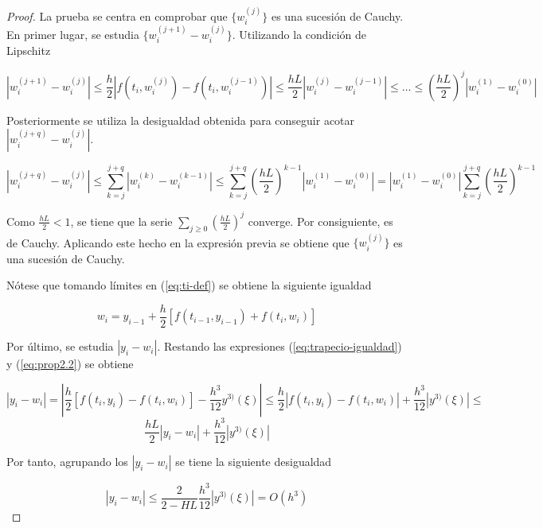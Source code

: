 \documentclass{article}
\theoremstyle{theorem-style}  %
\theoremstyle{definition}
\theoremstyle{example-style}
\begin{document}
		\begin{proof}
			La prueba se centra en comprobar que $\{w_i^{(j)}\}$ es una sucesión de Cauchy. En primer lugar, se estudia $\{w_{i}^{(j+1)} - w_{i}^{(j)}\}$. Utilizando la condición de Lipschitz
			
			\begin{equation*}
			\left|w_{i}^{(j+1)} - w_{i}^{(j)}\right| \le \frac{h}{2} \left| f(t_i, w_i^{(j)}) - f(t_i, w_i^{(j-1)}) \right| \le \frac{hL}{2} \left| w_i^{(j)} - w_i^{(j-1)} \right| \le \ldots \le \left(\frac{hL}{2}\right)^j \left|w_i^{(1)} - w_i^{(0)}\right|
			\end{equation*}
			
			Posteriormente se utiliza la desigualdad obtenida para conseguir acotar $\left|w_{i}^{(j+q)} - w_{i}^{(j)}\right|$. 
			
			\begin{equation*}
			\left|w_{i}^{(j+q)} - w_{i}^{(j)}\right| \le \sum_{k = j} ^ {j+q} \left|w_i^{(k)} - w_i^{(k-1)}\right| \le \sum_{k = j} ^ {j+q} \left(\frac{hL}{2}\right)^{k-1} \left|w_i^{(1)} - w_i^{(0)}\right| = \left|w_i^{(1)} - w_i^{(0)}\right| \sum_{k = j} ^ {j+q} \left(\frac{hL}{2}\right)^{k-1}
			\end{equation*}
			
			Como $\frac{hL}{2} < 1$, se tiene que la serie $\sum_{j \ge 0} \left(\frac{hL}{2}\right) ^j$ converge. Por consiguiente, es de Cauchy. Aplicando este hecho en la expresión previa se obtiene que $\{w_i^{(j)}\}$ es una sucesión de Cauchy. 
			
			Nótese que tomando límites en (\ref{eq:ti-def}) se obtiene la siguiente igualdad
			
			\begin{equation} \label{eq:prop2.2}
			w_{i} = y_{i-1} + \frac{h}{2} \left[f(t_{i-1}, y_{i-1}) + f(t_i, w_{i})\right]
			\end{equation}
			
			
			Por último, se estudia $\left|y_{i} - w_{i}\right|$. Restando las expresiones (\ref{eq:trapecio-igualdad}) y (\ref{eq:prop2.2}) se obtiene
			
			$$ \left|y_{i} - w_{i}\right| = \left|\frac{h}{2} \left[f(t_{i},y_{i}) - f(t_{i}, w_{i})\right] - \frac{h^3}{12}y^{3)}(\xi)\right| \le \frac{h}{2} \left|f(t_{i},y_{i}) - f(t_{i}, w_{i})\right| + \frac{h^3}{12}\left|y^{3)}(\xi)\right| \le$$
			$$ \frac{hL}{2} \left|y_{i} - w_{i}\right| + \frac{h^3}{12}\left|y^{3)}(\xi)\right| $$
			
			Por tanto, agrupando los $\left|y_{i} - w_{i}\right|$ se tiene la siguiente desigualdad
			
			\begin{equation*}
			\left|y_{i} - w_{i}\right| \le \frac{2}{2 - HL}\frac{h^3}{12}\left|y^{3)}(\xi)\right| = O(h^3)		
			\end{equation*}
			
		\end{proof}
\end{document}
